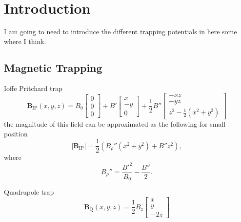 
\chapter{Introduction} %

\label{ch:intro} %


I am going to need to introduce the different trapping potentials in here some where I think.

\section{Magnetic Trapping} \label{sec:intromag}

Ioffe Pritchard trap
\begin{equation}
    \mathbf{B}_{\mathrm{IP}}(x,y,z) = B_0 \begin{bmatrix} 0\\ 0\\ 0 \end{bmatrix}
                      + B' \begin{bmatrix} x\\-y\\ 0 \end{bmatrix}
                      + \frac{1}{2}B'' \begin{bmatrix}-xz\\-yz\\ z^2-\frac{1}{2}\left(x^2+y^2\right) \end{bmatrix}
\end{equation}
the magnitude of this field can be approximated as the following for small position
\begin{equation}
    \left| \mathbf{B}_{\mathrm{IP}} \right| = \frac{1}{2}\left(B_{\rho}''\left(x^2+y^2\right) + B''z^2\right), \label{eq:ipmag}
\end{equation}
where 
\begin{equation*}
    B_\rho''= \frac{B'^2}{B_0} - \frac{B''}{2}. 
\end{equation*}


Quadrupole trap
\begin{equation}
    \mathbf{B}_{\mathrm{Q}}(x,y,z) = \frac{1}{2} B_z \begin{bmatrix} x\\ y\\ -2z \end{bmatrix}
\end{equation}